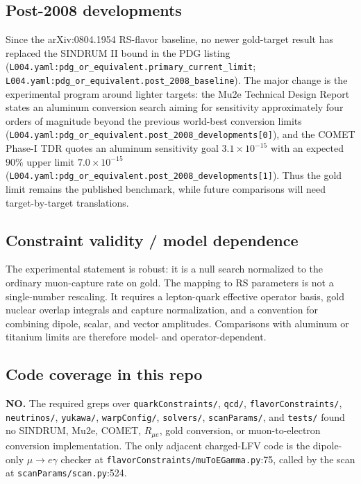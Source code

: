 \subsection*{Post-2008 developments}
Since the arXiv:0804.1954 RS-flavor baseline, no newer gold-target result has
replaced the SINDRUM II bound in the PDG listing
(\texttt{L004.yaml:pdg\_or\_equivalent.primary\_current\_limit};
\texttt{L004.yaml:pdg\_or\_equivalent.post\_2008\_baseline}).  The major
change is the experimental program around lighter targets: the Mu2e Technical
Design Report
states an aluminum conversion search aiming for sensitivity approximately four
orders of magnitude beyond the previous world-best conversion limits
(\texttt{L004.yaml:pdg\_or\_equivalent.post\_2008\_developments[0]}), and the
COMET Phase-I TDR quotes an aluminum sensitivity goal \(3.1\times10^{-15}\)
with an expected \(90\%\) upper limit \(7.0\times10^{-15}\)
(\texttt{L004.yaml:pdg\_or\_equivalent.post\_2008\_developments[1]}).  Thus the
gold limit remains the published benchmark, while future comparisons will need
target-by-target translations.

\subsection*{Constraint validity / model dependence}
The experimental statement is robust: it is a null search normalized to the
ordinary muon-capture rate on gold.  The mapping to RS parameters is not a
single-number rescaling.  It requires a lepton-quark effective operator basis,
gold nuclear overlap integrals and capture normalization, and a convention for
combining dipole, scalar, and vector amplitudes.  Comparisons with aluminum or
titanium limits are therefore model- and operator-dependent.

\subsection*{Code coverage in this repo}
\textbf{NO.}  The required greps over \texttt{quarkConstraints/}, \texttt{qcd/},
\texttt{flavorConstraints/}, \texttt{neutrinos/}, \texttt{yukawa/},
\texttt{warpConfig/}, \texttt{solvers/}, \texttt{scanParams/}, and
\texttt{tests/} found no SINDRUM, Mu2e, COMET, \(R_{\mu e}\), gold conversion,
or muon-to-electron conversion implementation.  The only adjacent charged-LFV
code is the dipole-only \(\mu\to e\gamma\) checker at
\texttt{flavorConstraints/muToEGamma.py}:75, called by the scan at
\texttt{scanParams/scan.py}:524.

